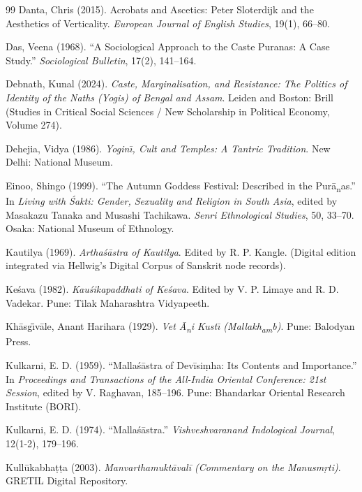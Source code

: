 \documentclass[11pt,twoside,letterpaper]{article}
\begin{document}
\begin{thebibliography}{99}
Danta, Chris (2015). Acrobats and Ascetics: Peter Sloterdijk and the Aesthetics of Verticality. \textit{European Journal of English Studies}, 19(1), 66--80.

Das, Veena (1968). ``A Sociological Approach to the Caste Puranas: A Case Study.'' \textit{Sociological Bulletin}, 17(2), 141--164.

Debnath, Kunal (2024). \textit{Caste, Marginalisation, and Resistance: The Politics of Identity of the Naths (Yogis) of Bengal and Assam}. Leiden and Boston: Brill (Studies in Critical Social Sciences / New Scholarship in Political Economy, Volume 274).

Dehejia, Vidya (1986). \textit{Yogin\={\i}, Cult and Temples: A Tantric Tradition}. New Delhi: National Museum.

Einoo, Shingo (1999). ``The Autumn Goddess Festival: Described in the Pur\={a}\textsubscript{n}as.'' In \textit{Living with \'Sakti: Gender, Sexuality and Religion in South Asia}, edited by Masakazu Tanaka and Musashi Tachikawa. \textit{Senri Ethnological Studies}, 50, 33--70. Osaka: National Museum of Ethnology.

Kautilya (1969). \textit{Arthaśāstra of Kautilya}. Edited by R. P. Kangle. (Digital edition integrated via Hellwig's Digital Corpus of Sanskrit node records).

Keśava (1982). \textit{Kauśikapaddhati of Keśava}. Edited by V. P. Limaye and R. D. Vadekar. Pune: Tilak Maharashtra Vidyapeeth.

Kh\={a}sg\={\={\i}}v\={a}le, Anant Harihara (1929). \textit{Vet \={A}\textsubscript{n}i Kust\={\i} (Mallakh\textsubscript{a}\textsubscript{m}b)}. Pune: Balodyan Press.

Kulkarni, E. D. (1959). ``Mallaśāstra of Devīsiṃha: Its Contents and Importance.'' In \textit{Proceedings and Transactions of the All-India Oriental Conference: 21st Session}, edited by V. Raghavan, 185--196. Pune: Bhandarkar Oriental Research Institute (BORI).

Kulkarni, E. D. (1974). ``Mallaśāstra.'' \textit{Vishveshvaranand Indological Journal}, 12(1-2), 179--196.

Kullūkabhaṭṭa (2003). \textit{Manvarthamuktāvalī (Commentary on the Manusmṛti)}. GRETIL Digital Repository.


\end{thebibliography}
\end{document}

